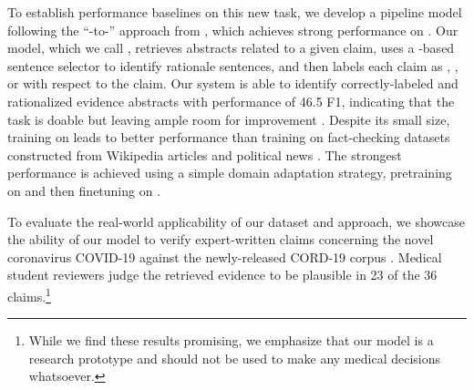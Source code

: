 To establish performance baselines on this new task, we develop a pipeline model following the ``\bert-to-\bert'' approach from \citet{DeYoung2019ERASERAB}, which achieves strong performance on \fever.  Our model, which we call \sysname,  retrieves abstracts related to a given claim, uses a \bert-based \cite{Devlin2019BERTPO} sentence selector to identify rationale sentences, and then labels each claim as \supports, , or \notenough with respect to the claim. Our system is able to identify correctly-labeled and rationalized evidence abstracts with performance of 46.5 F1, indicating that the task is doable but leaving ample room for improvement . Despite its small size, training \sysname on \ours leads to better performance than training on fact-checking datasets constructed from Wikipedia articles \cite{Thorne2018FEVERAL} and political news \cite{Hanselowski2019ARA}. The strongest performance is achieved using a simple domain adaptation strategy, pretraining on \fever and then finetuning on \ours.

To evaluate the real-world applicability of our dataset and approach, we showcase the ability of our model to verify expert-written claims concerning the novel coronavirus COVID-19 against the newly-released CORD-19 corpus \cite{Wang2020CORD19TC}. Medical student reviewers judge the retrieved evidence to be plausible in 23 of the 36 claims.\footnote{While we find these results promising, we emphasize that our model is a research prototype and should not be used to make any medical decisions whatsoever.}

